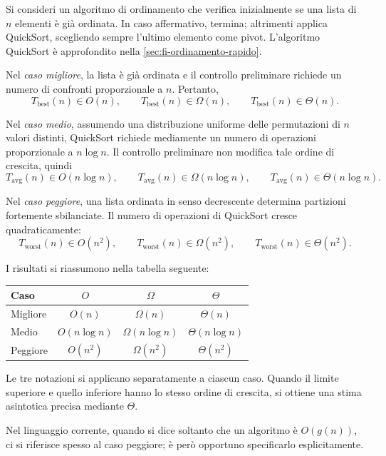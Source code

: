 \begin{example}
Si consideri un algoritmo di ordinamento che verifica inizialmente
se una lista di \(n\) elementi è già ordinata. In caso affermativo,
termina; altrimenti applica QuickSort, scegliendo sempre l'ultimo
elemento come pivot. L'algoritmo QuickSort è approfondito nella
\cref{sec:fi-ordinamento-rapido}.

Nel \emph{caso migliore}, la lista è già ordinata e il controllo
preliminare richiede un numero di confronti proporzionale a \(n\).
Pertanto,
\[
  T_{\mathrm{best}}(n)\in O(n),\qquad
  T_{\mathrm{best}}(n)\in\Omega(n),\qquad
  T_{\mathrm{best}}(n)\in\Theta(n).
\]

Nel \emph{caso medio}, assumendo una distribuzione uniforme delle
permutazioni di \(n\) valori distinti, QuickSort richiede mediamente
un numero di operazioni proporzionale a \(n\log n\). Il controllo
preliminare non modifica tale ordine di crescita, quindi
\[
  T_{\mathrm{avg}}(n)\in O(n\log n),\qquad
  T_{\mathrm{avg}}(n)\in\Omega(n\log n),\qquad
  T_{\mathrm{avg}}(n)\in\Theta(n\log n).
\]

Nel \emph{caso peggiore}, una lista ordinata in senso decrescente
determina partizioni fortemente sbilanciate. Il numero di operazioni
di QuickSort cresce quadraticamente:
\[
  T_{\mathrm{worst}}(n)\in O(n^2),\qquad
  T_{\mathrm{worst}}(n)\in\Omega(n^2),\qquad
  T_{\mathrm{worst}}(n)\in\Theta(n^2).
\]

I risultati si riassumono nella tabella seguente:
\begin{center}
\begin{tabular}{lccc}
  \hline
  Caso & \(O\) & \(\Omega\) & \(\Theta\)\\
  \hline
  Migliore & \(O(n)\) & \(\Omega(n)\) & \(\Theta(n)\)\\
  Medio & \(O(n\log n)\) & \(\Omega(n\log n)\)
        & \(\Theta(n\log n)\)\\
  Peggiore & \(O(n^2)\) & \(\Omega(n^2)\) & \(\Theta(n^2)\)\\
  \hline
\end{tabular}
\end{center}

Le tre notazioni si applicano separatamente a ciascun caso.
Quando il limite superiore e quello inferiore hanno lo stesso
ordine di crescita, si ottiene una stima asintotica precisa
mediante \(\Theta\).
\end{example}

Nel linguaggio corrente, quando si dice soltanto che un algoritmo
è \(O(g(n))\), ci si riferisce spesso al caso peggiore; è però opportuno
specificarlo esplicitamente.

